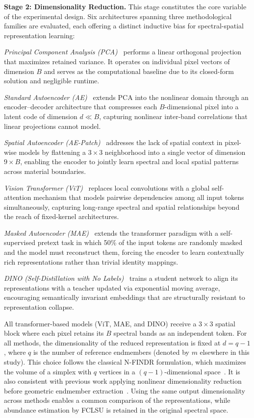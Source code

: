 \documentclass{article}
\begin{document}
\textbf{Stage 2: Dimensionality Reduction.} This stage constitutes the core variable of the experimental design. Six architectures spanning three methodological families are evaluated, each offering a distinct inductive bias for spectral-spatial representation learning:

\textit{Principal Component Analysis (PCA)}~\cite{gimenez2025hyperspectral} performs a linear orthogonal projection that maximizes retained variance. It operates on individual pixel vectors of dimension $B$ and serves as the computational baseline due to its closed-form solution and negligible runtime.

\textit{Standard Autoencoder (AE)}~\cite{Chen2014, hong2021egunet} extends PCA into the nonlinear domain through an encoder--decoder architecture that compresses each $B$-dimensional pixel into a latent code of dimension $d \ll B$, capturing nonlinear inter-band correlations that linear projections cannot model.

\textit{Spatial Autoencoder (AE-Patch)}~\cite{Chen2014, qi2022sscu} addresses the lack of spatial context in pixel-wise models by flattening a $3\times3$ neighborhood into a single vector of dimension $9 \times B$, enabling the encoder to jointly learn spectral and local spatial patterns across material boundaries.

\textit{Vision Transformer (ViT)}~\cite{dosovitskiy2021image, ghosh2022transformer} replaces local convolutions with a global self-attention mechanism that models pairwise dependencies among all input tokens simultaneously, capturing long-range spectral and spatial relationships beyond the reach of fixed-kernel architectures.

\textit{Masked Autoencoder (MAE)}~\cite{He2022, li2024s2mae} extends the transformer paradigm with a self-supervised pretext task in which 50\% of the input tokens are randomly masked and the model must reconstruct them, forcing the encoder to learn contextually rich representations rather than trivial identity mappings.

\textit{DINO (Self-Distillation with No Labels)}~\cite{Caron2021} trains a student network to align its representations with a teacher updated via exponential moving average, encouraging semantically invariant embeddings that are structurally resistant to representation collapse.

All transformer-based models (ViT, MAE, and DINO) receive a $3\times3$ spatial block where each pixel retains its $B$ spectral bands as an independent token. For all methods, the dimensionality of the reduced representation is fixed at $d=q-1$, where $q$ is the number of reference endmembers (denoted by $m$ elsewhere in this study). This choice follows the classical N-FINDR formulation, which maximizes the volume of a simplex with $q$ vertices in a $(q-1)$-dimensional space~\cite{remon2013performance}. It is also consistent with previous work applying nonlinear dimensionality reduction before geometric endmember extraction~\cite{nguyen2012hyperspectral}. Using the same output dimensionality across methods enables a common comparison of the representations, while abundance estimation by FCLSU is retained in the original spectral space.
\end{document}
